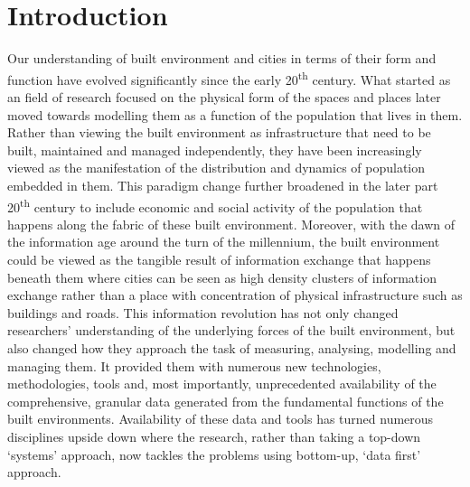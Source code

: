 \chapter{Introduction}

Our understanding of built environment and cities in terms of their form and function have evolved significantly since the early 20\textsuperscript{th} century.
What started as an field of research focused on the physical form of the spaces and places later moved towards modelling them as a function of the population that lives in them. 
Rather than viewing the built environment as infrastructure that need to be built, maintained and managed independently, they have been increasingly viewed as the manifestation of the distribution and dynamics of population embedded in them.
This paradigm change further broadened in the later part 20\textsuperscript{th} century to include economic and social activity of the population that happens along the fabric of these built environment.
Moreover, with the dawn of the information age around the turn of the millennium, the built environment could be viewed as the tangible result of information exchange that happens beneath them where cities can be seen as high density clusters of information exchange rather than a place with concentration of physical infrastructure such as buildings and roads.
This information revolution has not only changed researchers' understanding of the underlying forces of the built environment, but also changed how they approach the task of measuring, analysing, modelling and managing them.
It provided them with numerous new technologies, methodologies, tools and, most importantly, unprecedented availability of the comprehensive, granular data generated from the fundamental functions of the built environments.
Availability of these data and tools has turned numerous disciplines upside down where the research, rather than taking a top-down `systems' approach, now tackles the problems using bottom-up, `data first' approach. 


